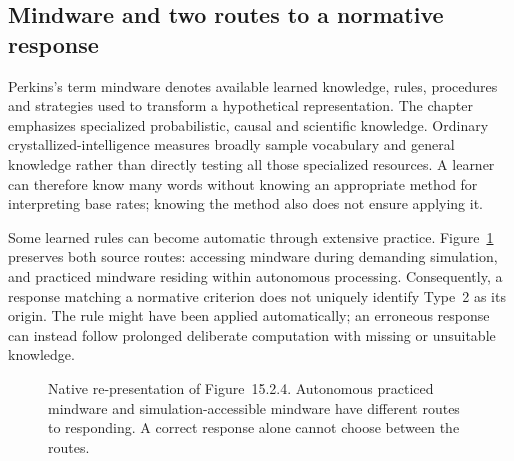 \subsection{Mindware and two routes to a normative response}

Perkins's term mindware denotes available learned knowledge, rules,
procedures and strategies used to transform a hypothetical representation.
The chapter emphasizes specialized probabilistic, causal and scientific
knowledge. Ordinary crystallized-intelligence measures broadly sample
vocabulary and general knowledge rather than directly testing all those
specialized resources. A learner can therefore know many words without
knowing an appropriate method for interpreting base rates; knowing the
method also does not ensure applying it.

Some learned rules can become automatic through extensive practice.
Figure~\ref{fig:p19-rat152-mindware} preserves both source routes: accessing
mindware during demanding simulation, and practiced mindware residing
within autonomous processing. Consequently, a response matching a normative
criterion does not uniquely identify Type~2 as its origin. The rule might
have been applied automatically; an erroneous response can instead follow
prolonged deliberate computation with missing or unsuitable knowledge.

\begin{figure}[htbp]
\centering
{}
\caption{Native re-presentation of Figure~15.2.4. Autonomous practiced
mindware and simulation-accessible mindware have different routes to
responding. A correct response alone cannot choose between the routes.}
\label{fig:p19-rat152-mindware}
\end{figure}

